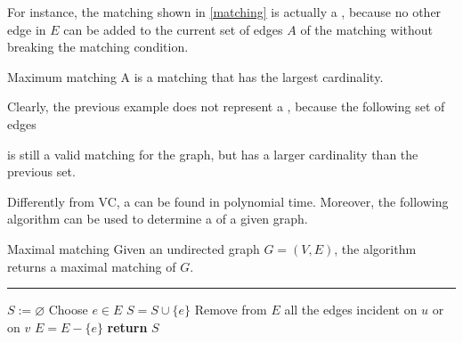 \documentclass[a4paper, 12pt]{report}
\begin{document}
    For instance, the matching shown in \cref{matching} is actually a , because no other edge in $E$ can be added to the current set of edges $A$ of the matching without breaking the matching condition.

    \begin{frameddefn}{Maximum matching}
        A  is a matching that has the largest cardinality.
    \end{frameddefn}
    
    Clearly, the previous example does not represent a , because the following set of edges

    \begin{figure}[H]
        \centering
    \end{figure}

    is still a valid matching for the graph, but has a larger cardinality than the previous set.

    Differently from VC, a  can be found in polynomial time. Moreover, the following algorithm can be used to determine a  of a given graph.

    \begin{framedalgo}{Maximal matching}
        Given an undirected graph $G = (V, E)$, the algorithm returns a maximal matching of $G$. \\
        \hrule

        \quad
        \begin{algorithmic}[1]
                \State $S := \varnothing$
                    \State Choose $e\in E$
                    \State $S = S \cup \{e\}$
                    \State Remove from $E$ all the edges incident on $u$ or on $v$
                    \State $E = E - \{e\}$
                \EndWhile
                \State \textbf{return} $S$
            \EndFunction
        \end{algorithmic}
    \end{framedalgo}
\end{document}
